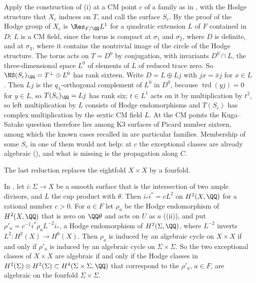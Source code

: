 \begin{remark}\label{rem:mumfordkscm}
Apply the construction of (i) at a CM point $c$ of a
family as in , with the Hodge structure that
$X_{c}$ induces on $T$, and call the surface $S_{c}$. By the proof of
 the Hodge group of $X_{c}$ is $\Res_{F/\QQ}L^{1}$ for a
quadratic extension $L$ of $F$ contained in $D$; $L$ is a CM field, since the
torus is compact at $\sigma_{1}$ and $\sigma_{2}$, where $D$ is definite, and
at $\sigma_{3}$, where it contains the nontrivial image of the circle of the
Hodge structure. The torus acts on $T=D^{0}$ by conjugation, with invariants
$D^{0}\cap L$, the three-dimensional space $L^{0}$ of elements of $L$ of
reduced trace zero. So $\NS(S_{c})_{\QQ}=T^{\perp}\oplus L^{0}$ has rank
sixteen. Write $D=L\oplus Lj$ with $jx=\bar{x}j$ for $x\in L$. Then $Lj$ is
the $q_{\lambda}$-orthogonal complement of $L^{0}$ in $D^{0}$, because
$\operatorname{trd}(yj)=0$ for $y\in L$, so $T(S_{c})_{\QQ}=Lj$ has rank six;
$t\in L^{1}$ acts on it by multiplication by $t^{2}$, so left multiplication
by $L$ consists of Hodge endomorphisms and $T(S_{c})$ has complex
multiplication by the sextic CM field $L$. At the CM points the Kuga--Satake
question therefore lies among K3 surfaces of Picard number sixteen, among
which the known cases recalled in  are particular
families. Membership of some $S_{c}$ in one of them would not help: at $c$ the exceptional classes are already algebraic
(), and what is missing is the propagation along $C$.
\end{remark}

The last reduction replaces the eightfold $X\times X$ by a fourfold.

\begin{proposition}[A surface in $X$]\label{prop:mumfordsurface}
In , let $i\colon\Sigma\to X$ be a smooth surface that is
the intersection of two ample divisors, and $L$ the cup product with
$\theta$. Then $i_{*}i^{*}=cL^{2}$ on $H^{2}(X,\QQ)$ for a rational number
$c>0$. For $a\in F$ let $\rho_{a}$ be the Hodge endomorphism of
$H^{2}(X,\QQ)$ that is zero on $\QQ\theta$ and acts on $U$ as $a$
((ii)), and put
$\rho'_{a}=c^{-1}i^{*}\rho_{a}L^{-2}i_{*}$, a Hodge endomorphism of
$H^{2}(\Sigma,\QQ)$, where $L^{-2}$ inverts $L^{2}\colon H^{2}(X)\to
H^{6}(X)$. Then $\rho_{a}$ is induced by an algebraic cycle on $X\times X$ if
and only if $\rho'_{a}$ is induced by an algebraic cycle on $\Sigma\times
\Sigma$. So the two exceptional classes of $X\times X$ are algebraic if and
only if the Hodge classes in $H^{2}(\Sigma)\otimes H^{2}(\Sigma)\subset
H^{4}(\Sigma\times\Sigma,\QQ)$ that correspond to the $\rho'_{a}$, $a\in F$,
are algebraic on the fourfold $\Sigma\times\Sigma$.
\end{proposition}

